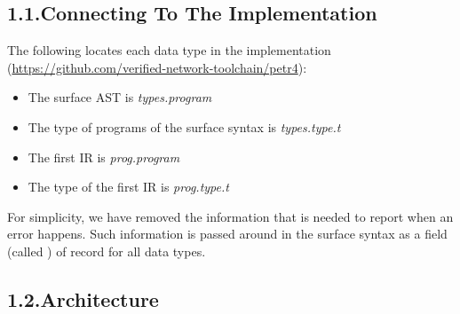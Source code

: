 \documentclass[11pt]{article}
\begin{document}
{%
\subsection{1.1.\hspace*{0.5em}Connecting To The Implementation}%

\noindent{}The following locates each data type in the implementation
(\href{https://github.com/verified-network-toolchain/petr4}{{\ttfamily https://\hspace{0pt}github.\hspace{0pt}com/\hspace{0pt}verified-\hspace{0pt}network-\hspace{0pt}toolchain/\hspace{0pt}petr4}}):%

\begin{itemize}[noitemsep,topsep=\mdcompacttopsep]%

\item{}The surface AST is \emph{types.program}%

\item{}The type of programs of the surface syntax is \emph{types.type.t}%

\item{}The first IR is \emph{prog.program}%

\item{}The type of the first IR is \emph{prog.type.t}%
\end{itemize}%

\noindent{}For simplicity, we have removed the information that is needed to report when an error
happens. Such information is passed around in the surface syntax as a field (called
) of record for all data types.%

\subsection{1.2.\hspace*{0.5em}Architecture}%

}
\end{document}
